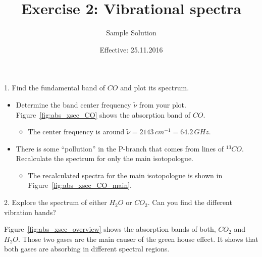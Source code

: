 \documentclass[paper=a4, fontsize=11pt]{scrartcl} %
\title{Exercise 2: Vibrational spectra}
\author{Sample Solution}
\date{Effective: 25.11.2016}
\begin{document}
\maketitle

1. Find the fundamental band of $CO$ and plot its spectrum.
\begin{itemize}
  \item Determine the band center frequency $\tilde{\nu}$ from your plot.
    Figure~\ref{fig:abs_xsec_CO} shows the absorption band of $CO$.
    \begin{itemize}
      \item The center frequency is around $\tilde{\nu} = 2143\,cm^{-1} = 64.2\,GHz$.
    \end{itemize}

  \item There is some “pollution” in the P-branch that comes from lines of $^{13}CO$.
    Recalculate the spectrum for only the main isotopologue.
    \begin{itemize}
      \item The recalculated spectra for the main isotopologue is shown in
        Figure~\ref{fig:abs_xsec_CO_main}.
    \end{itemize}
\end{itemize}

2. Explore the spectrum of either $H_2O$ or $CO_2$. Can you find the different
vibration bands?

Figure~\ref{fig:abs_xsec_overview} shows the absorption bands of both, $CO_2$
and $H_2O$. Those two gases are the main causer of the green house effect. It
shows that both gases are absorbing in different spectral regions.
\end{document}
